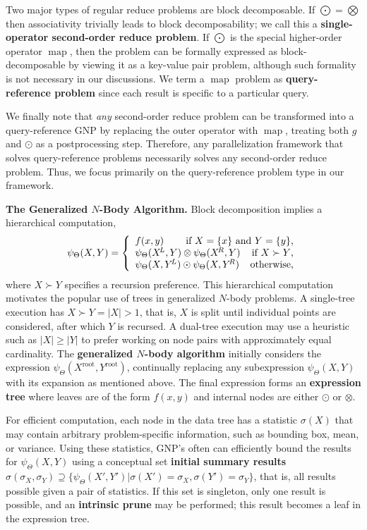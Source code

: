 \documentclass[times, leqno,twocolumn]{article}
\newcommand{\prefsplit}[2]{#1 \succ #2}
\newcommand{\summary}{\hat{\sigma}}
\DeclareMathOperator*{\map}{map}
\newcommand{\gnp}{\psi_{\Theta}}
\newcommand{\defterm}[1]{{\bf #1}}
\newcommand{\kdroot}[1]{#1^{\text{root}}}
\newcommand{\kdleft}[1]{#1^{\!L}}
\newcommand{\kdright}[1]{#1^{\!R}}
\newcommand{\outstat}{\sigma}
\begin{document}
Two major types of regular reduce problems are block decomposable.
If $\bigodot = \bigotimes$ then associativity trivially leads to block decomposability; we call this a \defterm{single-operator second-order reduce problem}.
If $\bigodot$ is the special higher-order operator $\map$, then the problem can be formally expressed as block-decomposable by viewing it as a key-value pair problem, although such formality is not necessary in our discussions.
We term a $\map$ problem as \defterm{query-reference problem} since each result is specific to a particular query.

We finally note that {\it any} second-order reduce problem can be transformed into a query-reference GNP by replacing the outer operator with $\map$, treating both $g$ and $\odot$ as a postprocessing step.
Therefore, any parallelization framework that solves query-reference problems necessarily solves any second-order reduce problem.
Thus, we focus primarily on the query-reference problem type in our framework.

{\bf The Generalized $N$-Body Algorithm.}
Block decomposition implies a hierarchical computation,
\[
\gnp(X,Y) = \left\{ \begin{array}{lrr}
    f(x,y) & \multicolumn{2}{r}{\text{if }X = \{x\}\text{ and }Y = \{y\}\text{,}}
    \\
    \multicolumn{2}{l}{\gnp(\kdleft{X},Y) \otimes \gnp(\kdright{X}, Y)} & \text{if }\prefsplit{X}{Y}\text{,}
    \\
    \multicolumn{2}{l}{\gnp(X,\kdleft{Y}) \odot \gnp(X,\kdright{Y})} & \text{otherwise,}
  \end{array}
\right.
\]
\noindent where $\prefsplit{X}{Y}$ specifies a recursion preference.
This hierarchical computation motivates the popular use of trees in generalized $N$-body problems.
A single-tree execution has $\prefsplit{X}{Y} = |X| > 1$, that is, $X$ is split until individual points are considered, after which $Y$ is recursed.
A dual-tree execution may use a heuristic such as $|X| \geq |Y|$ to prefer working on node pairs with approximately equal cardinality.
The \defterm{generalized $N$-body algorithm} initially considers the expression $\gnp(\kdroot{X}, \kdroot{Y})$, continually replacing any subexpression $\gnp(X, Y)$ with its expansion as mentioned above.
The final expression forms an \defterm{expression tree} where leaves are of the form $f(x,y)$ and internal nodes are either $\odot$ or $\otimes$.

For efficient computation, each node in the data tree has a statistic $\outstat(X)$ that may contain arbitrary problem-specific information, such as bounding box, mean, or variance.
Using these statistics, GNP's often can efficiently bound the results for $\gnp(X,Y)$ using a conceptual set \defterm{initial summary results} $\summary(\outstat_X,\outstat_Y) \supseteq \{\gnp(X',Y') | \outstat(X')\!\!=\!\!\outstat_X, \outstat(Y')\!\!=\!\!\outstat_Y\}$, that is, all results possible given a pair of statistics.
If this set is singleton, only one result is possible, and an \defterm{intrinsic prune} may be performed; this result becomes a leaf in the expression tree.
\end{document}
